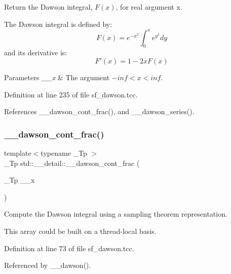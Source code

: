 Return the Dawson integral, $ F(x) $, for real argument {\ttfamily x}. 

The Dawson integral is defined by\+: \[ F(x) = e^{-x^2} \int_0^x e^{y^2} dy \] and it\textquotesingle{}s derivative is\+: \[ F'(x) = 1 - 2xF(x) \]


\begin{DoxyParams}{Parameters}
{\em \+\_\+\+\_\+x} & The argument $ -inf < x < inf $. \\
\hline
\end{DoxyParams}


Definition at line 235 of file sf\+\_\+dawson.\+tcc.



References \+\_\+\+\_\+dawson\+\_\+cont\+\_\+frac(), and \+\_\+\+\_\+dawson\+\_\+series().

\mbox{\label{namespacestd_1_1____detail_a3ad3b7b4dcebdf69778dbf7a5ba2427c}} 
\subsubsection{\texorpdfstring{\+\_\+\+\_\+dawson\+\_\+cont\+\_\+frac()}{\_\_dawson\_cont\_frac()}}
{\footnotesize\ttfamily template$<$typename \+\_\+\+Tp $>$ \\
\+\_\+\+Tp std\+::\+\_\+\+\_\+detail\+::\+\_\+\+\_\+dawson\+\_\+cont\+\_\+frac (\begin{DoxyParamCaption}\item[{\+\_\+\+Tp}]{\+\_\+\+\_\+x }\end{DoxyParamCaption})}



Compute the Dawson integral using a sampling theorem representation. 

This array could be built on a thread-\/local basis. 

Definition at line 73 of file sf\+\_\+dawson.\+tcc.



Referenced by \+\_\+\+\_\+dawson().

\mbox{\label{namespacestd_1_1____detail_a033d91cc1c67280385ff3d1d809a21d1}} 
